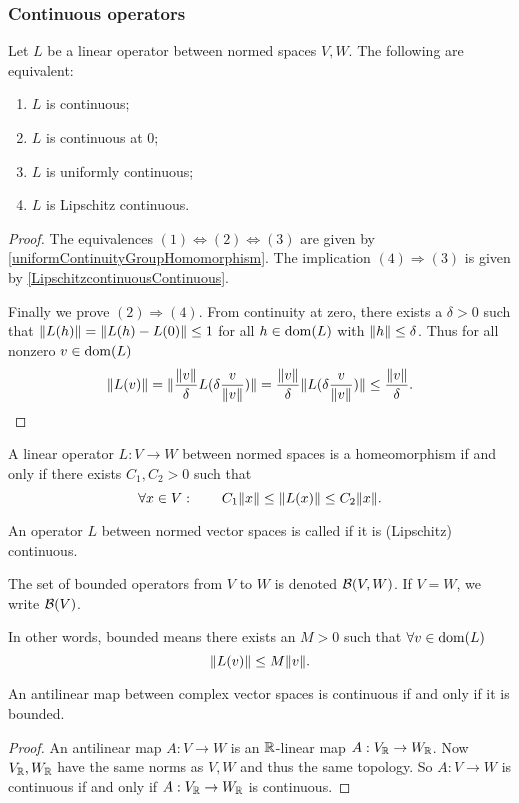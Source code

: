 \subsubsection{Continuous operators}
\begin{theorem} \label{boundedLinearMaps}
Let $L$ be a linear operator between normed spaces $V,W$. The following are equivalent:
\begin{enumerate}
\item $L$ is continuous;
\item $L$ is continuous at $0$;
\item $L$ is uniformly continuous;
\item $L$ is Lipschitz continuous.
\end{enumerate}
\end{theorem}
\begin{proof}
The equivalences $(1) \Leftrightarrow (2) \Leftrightarrow (3)$ are given by \ref{uniformContinuityGroupHomomorphism}. The implication $(4)\Rightarrow (3)$ is given by \ref{LipschitzcontinuousContinuous}.

Finally we prove $(2)\Rightarrow (4)$. From continuity at zero, there exists a $\delta>0$ such that $\lVert L(h)\rVert = \lVert L(h)-L(0)\rVert \leq 1$ for all $h\in \operatorname{dom}(L)$ with $\lVert h\rVert\leq \delta$. Thus for all nonzero $v\in \operatorname{dom}(L)$
\[ \lVert L(v)\rVert = \lVert\frac{\lVert v\rVert}{\delta}L(\delta \frac{v}{\lVert v\rVert})\rVert = \frac{\lVert v\rVert}{\delta}\lVert L(\delta \frac{v}{\lVert v\rVert})\rVert\leq \frac{\lVert v\rVert}{\delta}. \]
\end{proof}
\begin{corollary}
A linear operator $L:V\to W$ between normed spaces is a homeomorphism \textup{if and only if} there exists $C_1,C_2> 0$ such that
\[ \forall x\in V:\qquad C_1\lVert x\rVert\leq \lVert L(x)\rVert \leq C_2\lVert x\rVert. \]
\end{corollary}

\begin{definition}
An operator $L$ between normed vector spaces is called  if it is (Lipschitz) continuous.

The set of bounded operators from $V$ to $W$ is denoted $\operatorname{\mathcal{B}}(V,W)$. If $V=W$, we write $\operatorname{\mathcal{B}}(V)$.
\end{definition}
In other words, bounded means there exists an $M>0$ such that $\forall v\in \operatorname{dom}(L)$
\[ \lVert L(v)\rVert \leq M \lVert v\rVert. \]

\begin{proposition} \label{boundedAntiLinearMaps}
An antilinear map between complex vector spaces is continuous \textup{if and only if} it is bounded.
\end{proposition}
\begin{proof}
An antilinear map $A:V\to W$ is an $\mathbb{R}$-linear map $A:V_{\mathbb{R}}\to W_{\mathbb{R}}$. Now $V_{\mathbb{R}}, W_{\mathbb{R}}$ have the same norms as $V,W$ and thus the same topology. So $A:V\to W$ is continuous if and only if $A:V_{\mathbb{R}}\to W_{\mathbb{R}}$ is continuous.
\end{proof}


